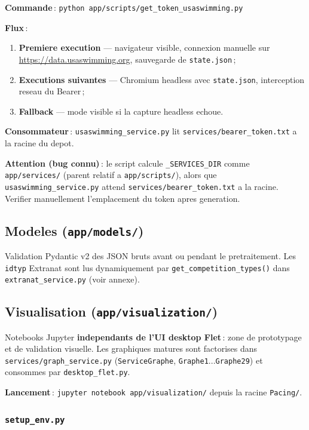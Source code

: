 \documentclass[11pt,a4paper]{article}
\begin{document}
\textbf{Commande}\,: \texttt{python app/scripts/get\_token\_usaswimming.py}

\textbf{Flux}\,:
\begin{enumerate}
  \item \textbf{Premiere execution} --- navigateur visible, connexion manuelle sur \url{https://data.usaswimming.org}, sauvegarde de \texttt{state.json}\,;
  \item \textbf{Executions suivantes} --- Chromium headless avec \texttt{state.json}, interception reseau du Bearer\,;
  \item \textbf{Fallback} --- mode visible si la capture headless echoue.
\end{enumerate}

\textbf{Consommateur}\,: \texttt{usaswimming\_service.py} lit \texttt{services/bearer\_token.txt} a la racine du depot.

\textbf{Attention (bug connu)}\,: le script calcule \texttt{\_SERVICES\_DIR} comme \texttt{app/services/} (parent relatif a \texttt{app/scripts/}), alors que \texttt{usaswimming\_service.py} attend \texttt{services/bearer\_token.txt} a la racine. Verifier manuellement l'emplacement du token apres generation.

\subsection{Modeles (\texttt{app/models/})}

Validation Pydantic v2 des JSON bruts avant ou pendant le pretraitement. Les \texttt{idtyp} Extranat sont lus dynamiquement par \texttt{get\_competition\_types()} dans \texttt{extranat\_service.py} (voir annexe).

\subsection{Visualisation (\texttt{app/visualization/})}

Notebooks Jupyter \textbf{independants de l'UI desktop Flet}\,: zone de prototypage et de validation visuelle. Les graphiques matures sont factorises dans \texttt{services/graph\_service.py} (\texttt{ServiceGraphe}, \texttt{Graphe1}...\texttt{Graphe29}) et consommes par \texttt{desktop\_flet.py}.

\textbf{Lancement}\,: \texttt{jupyter notebook app/visualization/} depuis la racine \texttt{Pacing/}.

\subsubsection{\texttt{setup\_env.py}}
\end{document}

